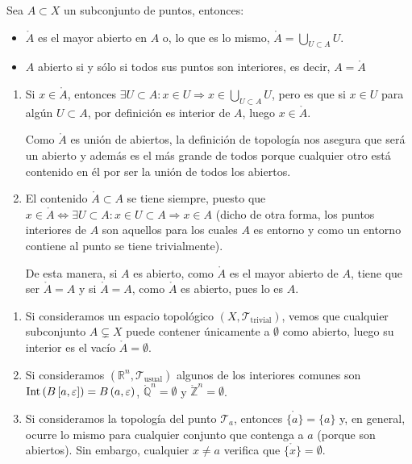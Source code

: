 \begin{prop}
Sea $A\subset X$ un subconjunto de puntos, entonces:
\begin{itemize}
\item $\mathring{A}$ es el mayor abierto en $A$ o, lo que es lo mismo, $ \mathring{A} = \bigcup_{U \subset A} U$.
\item $A$ abierto si y sólo si todos sus puntos son interiores, es decir, $A = \mathring{A}$
\end{itemize}
\end{prop}
\begin{demo}
\begin{enumerate}
    \item Si $x\in \mathring{A}$, entonces $\exists U \subset A : x\in U \Rightarrow x\in \bigcup_{U\subset A}U$, pero es que si $x\in U$ para algún $U\subset A$, por definición es interior de $A$, luego $x\in \mathring{A}$.
   
   Como $\mathring{A}$ es unión de abiertos, la definición de topología nos asegura que será un abierto y además es el más grande de todos porque cualquier otro está contenido en él por ser la unión de todos los abiertos.   
   \item El contenido $\mathring{A}\subset A$ se tiene siempre, puesto que $x\in \mathring{A}\Leftrightarrow \exists U \subset A : x\in U \subset A \Rightarrow x\in A$ (dicho de otra forma, los puntos interiores de $A$ son aquellos para los cuales $A$ es entorno y como un entorno contiene al punto se tiene trivialmente).
   
   De esta manera, si $A$ es abierto, como $\mathring{A}$ es el mayor abierto de $A$, tiene que ser $\mathring{A} = A$ y si $\mathring{A} = A$, como $\mathring{A}$ es abierto, pues lo es $A$.
\end{enumerate}
\end{demo}

\begin{ej}
\begin{enumerate}
    \item Si consideramos un espacio topológico $\left( X, \mathcal{T}_{\text{trivial}} \right)$, vemos que cualquier subconjunto $A \subsetneq X$ puede contener únicamente a $\emptyset$ como abierto, luego su interior es el vacío $\mathring{A} = \emptyset$.

    \item Si consideramos $(\mathbb{R}^n, \mathcal{T}_{\text{usual}})$ algunos de los interiores comunes son $\operatorname{Int}\left( B\left[ a, \varepsilon \right] \right)  = B\left( a, \varepsilon \right)$, $\mathring{\mathbb{Q}}^n = \emptyset$ y $\mathring{\mathbb{Z}}^n = \emptyset$.
    
    \item Si consideramos la topología del punto $\mathcal{T}_a$, entonces $\mathring{\{a\}} = \{a\}$ y, en general, ocurre lo mismo para cualquier conjunto que contenga a $a$ (porque son abiertos). Sin embargo, cualquier $x \neq a$ verifica que $\mathring{\{x\}} = \emptyset$.
\end{enumerate}
\end{ej}

